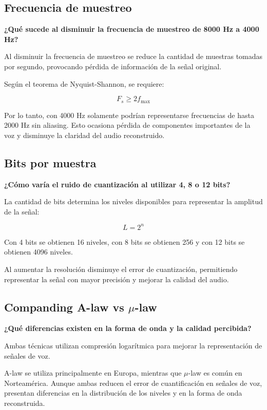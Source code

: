 \documentclass[12pt,a4paper]{article}
\begin{document}
\subsection{Frecuencia de muestreo}

\textbf{¿Qué sucede al disminuir la frecuencia de muestreo
de 8000 Hz a 4000 Hz?}

Al disminuir la frecuencia de muestreo se reduce la cantidad
de muestras tomadas por segundo, provocando pérdida de
información de la señal original.

Según el teorema de Nyquist-Shannon, se requiere:

\[
F_s \geq 2f_{\max}
\]

Por lo tanto, con 4000 Hz solamente podrían representarse
frecuencias de hasta 2000 Hz sin aliasing. Esto ocasiona
pérdida de componentes importantes de la voz y disminuye
la claridad del audio reconstruido.

\subsection{Bits por muestra}

\textbf{¿Cómo varía el ruido de cuantización al utilizar
4, 8 o 12 bits?}

La cantidad de bits determina los niveles disponibles para
representar la amplitud de la señal:

\[
L=2^n
\]

Con 4 bits se obtienen 16 niveles, con 8 bits se obtienen
256 y con 12 bits se obtienen 4096 niveles.

Al aumentar la resolución disminuye el error de
cuantización, permitiendo representar la señal con mayor
precisión y mejorar la calidad del audio.

\subsection{Companding A-law vs $\mu$-law}

\textbf{¿Qué diferencias existen en la forma de onda y
la calidad percibida?}

Ambas técnicas utilizan compresión logarítmica para mejorar
la representación de señales de voz.

A-law se utiliza principalmente en Europa, mientras que
$\mu$-law es común en Norteamérica. Aunque ambas reducen
el error de cuantificación en señales de voz, presentan
diferencias en la distribución de los niveles y en la
forma de onda reconstruida.
\end{document}
